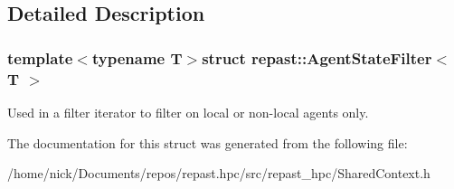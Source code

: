 \subsection{Detailed Description}
\subsubsection*{template$<$typename T$>$struct repast\-::\-Agent\-State\-Filter$<$ T $>$}

Used in a filter iterator to filter on local or non-\/local agents only. 

The documentation for this struct was generated from the following file\-:\begin{DoxyCompactItemize}
\item 
/home/nick/\-Documents/repos/repast.\-hpc/src/repast\-\_\-hpc/Shared\-Context.\-h\end{DoxyCompactItemize}
